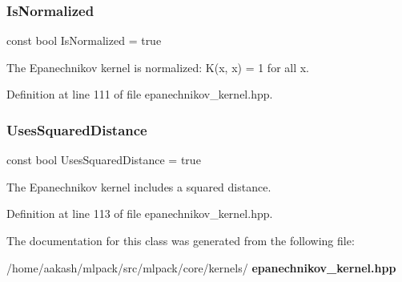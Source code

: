 \subsubsection{Is\+Normalized}
{\footnotesize\ttfamily const bool Is\+Normalized = true\hspace{0.3cm}{\ttfamily [static]}}



The Epanechnikov kernel is normalized\+: K(x, x) = 1 for all x. 



Definition at line 111 of file epanechnikov\+\_\+kernel.\+hpp.

\mbox{\label{classmlpack_1_1kernel_1_1KernelTraits_3_01EpanechnikovKernel_01_4_a12fc177e124e69c8efbac5b08e5c5196}} 
\subsubsection{Uses\+Squared\+Distance}
{\footnotesize\ttfamily const bool Uses\+Squared\+Distance = true\hspace{0.3cm}{\ttfamily [static]}}



The Epanechnikov kernel includes a squared distance. 



Definition at line 113 of file epanechnikov\+\_\+kernel.\+hpp.



The documentation for this class was generated from the following file\+:\begin{DoxyCompactItemize}
\item 
/home/aakash/mlpack/src/mlpack/core/kernels/\textbf{ epanechnikov\+\_\+kernel.\+hpp}\end{DoxyCompactItemize}
